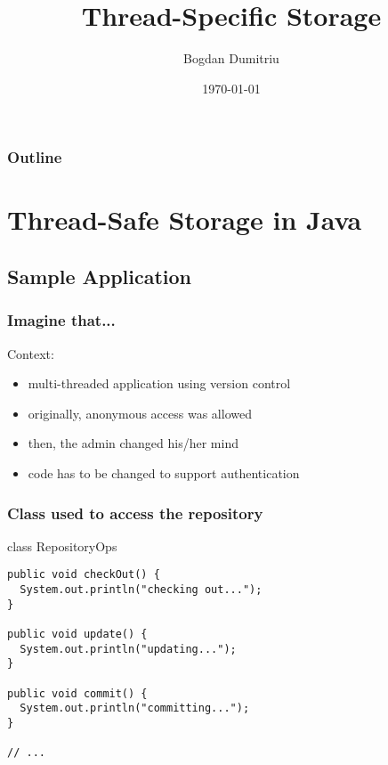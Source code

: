 \documentclass{beamer}
\title{Thread-Specific Storage}
\author{Bogdan Dumitriu}
\institute
{
  Department of Computer Science\\
  University of Utrecht
}
\date{\today}
\begin{document}
\begin{frame}
  \titlepage
\end{frame}

\begin{frame}
  \frametitle{Outline}
  \tableofcontents
\end{frame}

\section{Thread-Safe Storage in Java}

\subsection{Sample Application}

\begin{frame}
  \frametitle{Imagine that...}

Context:
\begin{itemize}
\item multi-threaded application using version control
\item originally, anonymous access was allowed
\item then, the admin changed his/her mind
\item code has to be changed to support authentication
\end{itemize}

\end{frame}

\begin{frame}[fragile]
  \frametitle{Class used to access the repository}

\begin{block}{class RepositoryOps}
\begin{verbatim}
public void checkOut() {
  System.out.println("checking out...");
}

public void update() {
  System.out.println("updating...");
}

public void commit() {
  System.out.println("committing...");
}

// ...
\end{verbatim}
\end{block}

\end{frame}
\end{document}
